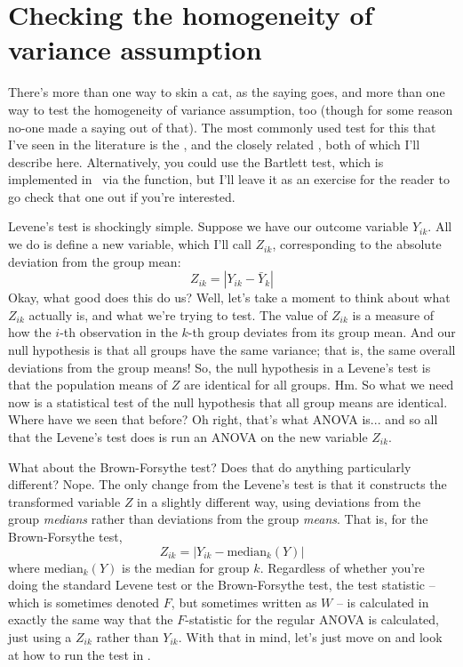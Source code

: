 \section{Checking the homogeneity of variance assumption~\label{sec:levene}}

There's more than one way to skin a cat, as the saying goes, and more than one way to test the homogeneity of variance assumption, too (though for some reason no-one made a saying out of that). The most commonly used test for this that I've seen in the literature is the  \cite{Levene1960}, and the closely related  \cite{BrownForsythe1974}, both of which I'll describe here. Alternatively, you could use the Bartlett test, which is implemented in \R\ via the  function, but I'll leave it as an exercise for the reader to go check that one out if you're interested.

Levene's test is shockingly simple. Suppose we have our outcome variable $Y_{ik}$. All we do is define a new variable, which I'll call $Z_{ik}$, corresponding to the absolute deviation from the group mean:
$$
Z_{ik} = \left| Y_{ik} - \bar{Y}_k \right|
$$
Okay, what good does this do us? Well, let's take a moment to think about what $Z_{ik}$ actually is, and what we're trying to test. The value of $Z_{ik}$ is a measure of how the $i$-th observation in the $k$-th group deviates from its group mean. And our null hypothesis is that all groups have the same variance; that is, the same overall deviations from the group means! So, the null hypothesis in a Levene's test is that the population means of $Z$ are identical for all groups. Hm. So what we need now is a statistical test of the null hypothesis that all group means are identical. Where have we seen that before? Oh right, that's what ANOVA is... and so all that the Levene's test does is run an ANOVA on the new variable $Z_{ik}$. 

What about the Brown-Forsythe test? Does that do anything particularly different? Nope. The only change from the Levene's test is that it constructs the transformed variable $Z$ in a slightly different way, using deviations from the group {\it medians} rather than deviations from the group {\it means}. That is, for the Brown-Forsythe test, 
$$
Z_{ik} = \left| Y_{ik} - \mbox{median}_k(Y) \right|
$$
where $\mbox{median}_k(Y)$ is the median for group $k$. Regardless of whether you're doing the standard Levene test or the Brown-Forsythe test, the test statistic -- which is sometimes denoted $F$, but sometimes written as $W$ -- is  calculated in exactly the same way that the $F$-statistic for the regular ANOVA is calculated, just using a $Z_{ik}$ rather than $Y_{ik}$. With that in mind, let's just move on and look at how to run the test in \R.



